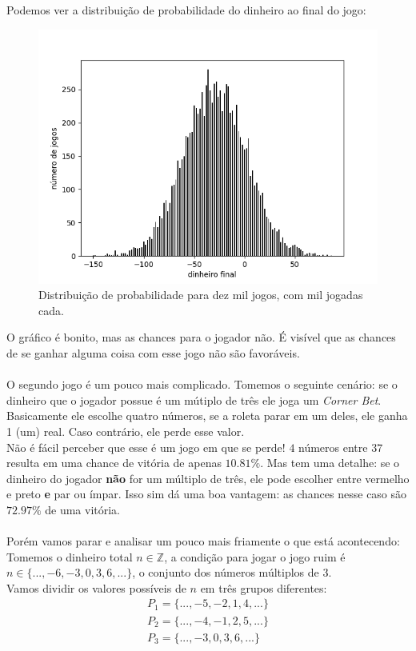 \documentclass[12pt]{article}
\begin{document}
Podemos ver a distribuição de probabilidade do dinheiro ao final do jogo:

\begin{figure}[H]
\centering
\includegraphics[scale=0.8]{graph5.png}
\caption{Distribuição de probabilidade para dez mil jogos, com mil jogadas cada.}
\end{figure}

O gráfico é bonito, mas as chances para o jogador não. É visível que as chances de se ganhar alguma coisa com esse jogo não são favoráveis.\\
\\
O segundo jogo é um pouco mais complicado. Tomemos o seguinte cenário: se o dinheiro que o jogador possue é um mútiplo de três ele joga um \textit{Corner Bet}. Basicamente ele escolhe quatro números, se a roleta parar em um deles, ele ganha 1 (um) real. Caso contrário, ele perde esse valor.\\
Não é fácil perceber que esse é um jogo em que se perde! $4$ números entre $37$ resulta em uma chance de vitória de apenas $10.81\%$. Mas tem uma detalhe: se o dinheiro do jogador \textbf{não} for um múltiplo de três, ele pode escolher entre vermelho e preto \textbf{e} par ou ímpar. Isso sim dá uma boa vantagem: as chances nesse caso são $72.97\%$ de uma vitória.\\
\\
Porém vamos parar e analisar um pouco mais friamente o que está acontecendo:\\
Tomemos o dinheiro total $n \in \mathbb{Z}$, a condição para jogar o jogo ruim é $n \in \{..., -6, -3, 0, 3, 6, ...\}$, o conjunto dos números múltiplos de 3.\\
Vamos dividir os valores possíveis de $n$ em três grupos diferentes: 
\begin{align*}
P_{1} = \{..., -5, -2, 1, 4, ...\}\\
P_{2} =  \{..., -4, -1, 2, 5, ...\}\\
P_{3} = \{..., -3, 0, 3, 6, ...\}
\end{align*}
\end{document}
